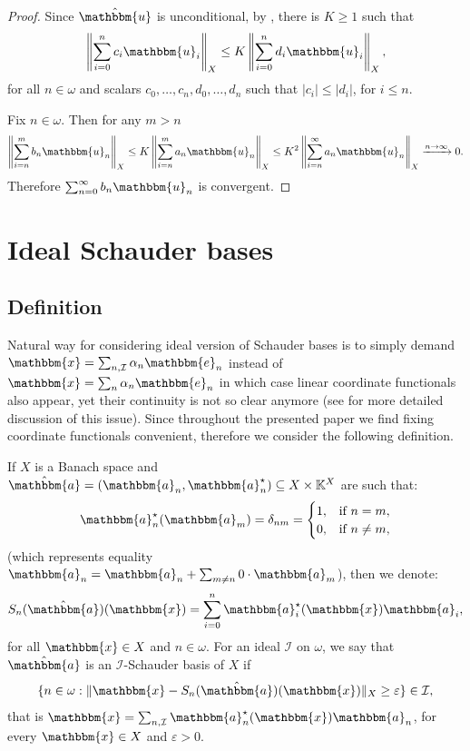 \documentclass[10pt,a4paper]{amsart}
\newcommand{\IK}{\mathbb{K}}
\newcommand{\I}{\mathcal{I}}
\newcommand{\w}{\mathbbm}
\begin{document}
\begin{proof}
Since $\hat{\w{u}}$ is unconditional, by \cite[Proposition 3.1.3]{AK}, there is $K\geq 1$ such that
    \[
    \left\| \sum_{i=0}^n c_i \w{u}_i \right\|_X \leq K \left\| \sum_{i=0}^n d_i \w{u}_i \right\|_X,
\]
for all $n\in\omega$ and scalars $c_0,\ldots,c_n,d_0,\ldots,d_n$ such that $|c_i|\leq |d_i|$, for $i\leq n$.

Fix $n\in\omega$. Then for any $m>n$ 
    \[
    \left\| \sum_{i=n}^m b_n \w{u}_n \right\|_X \leq K \left\| \sum_{i=n}^m a_n \w{u}_n \right\|_X \leq  K^2 \left\| \sum_{i=n}^\infty a_n \w{u}_n \right\|_X \xrightarrow{n \to \infty} 0.
\]
Therefore $ \sum_{n=0}^\infty b_n \w{u}_n  $ is convergent.
\end{proof}



\section{Ideal Schauder bases}

\subsection{Definition}

Natural way for considering ideal version of Schauder bases is to simply demand $\w{x}=\sum_{n,\I} \alpha_n \w{e}_n$ instead of $\w{x}=\sum_{n} \alpha_n \w{e}_n$ in which case linear coordinate functionals also appear, yet their continuity is not so clear anymore (see \cite{CGK,RKS,KS,Kochanek}  for more detailed discussion of this issue). Since throughout the presented paper we find fixing coordinate functionals convenient, therefore we consider the following definition.

If $X$ is a Banach space and $\hat{\w{a}}=(\w{a}_n,\w{a}^\star_n)\subseteq X\times \IK^X$ are such that: 
\[
\w{a}^\star_n(\w{a}_m)=\delta_{nm}=\begin{cases}
    1, & \text{if }n=m,\\
    0, & \text{if }n\neq m,
\end{cases}
\]
(which represents equality $\w{a}_n=\w{a}_n +\sum_{m\neq n}0\cdot \w{a}_m$), then we denote: 
\[
S_n(\hat{\w{a}})(\w{x})=\sum_{i=0}^n \w{a}_i^\star(\w{x}) \w{a}_i,
\]
for all $\w{x}\in X$ and $n\in\omega$. For an ideal $\I$ on $\omega$, we say that $\hat{\w{a}}$ is an $\I$-Schauder basis of $X$ if
\[
\{n\in\omega: \|\w{x}-S_n(\hat{\w{a}})(\w{x})\|_X\geq\varepsilon\}\in\I,
\]
that is $\w{x}=\sum_{n,\I} \w{a}^\star_n(\w{x})\w{a}_n$, for every $\w{x}\in X$ and $\varepsilon>0$.
\end{document}
